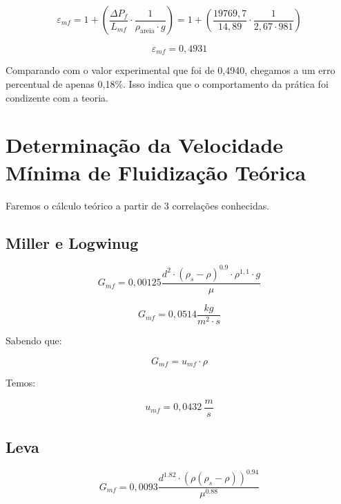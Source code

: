 \begin{equation}\label{key}
\varepsilon_{m f}=1+\left(\frac{\Delta P_{f}}{L_{m f}} \cdot \frac{1}{\rho_{\text {areia}} \cdot g}\right)=1+\left(\frac{19769,7}{14,89} \cdot \frac{1}{2,67 \cdot 981}\right)
\end{equation}

\begin{equation}\label{key}
\varepsilon_{m f}=0,4931
\end{equation}

Comparando com o valor experimental que foi de 0,4940, chegamos a um erro percentual de apenas 0,18\%. Isso indica que o comportamento da prática foi condizente com a teoria.

\section{Determinação da Velocidade Mínima de Fluidização Teórica}

Faremos o cálculo teórico a partir de 3 correlações conhecidas.

\subsection{Miller e Logwinug}


\begin{equation}\label{key}
G_{m f}=0,00125 \dfrac{d^{2} \cdot\left(\rho_{s}-\rho\right)^{0.9} \cdot \rho^{1,1} \cdot g}{\mu}
\end{equation}

\begin{equation}\label{key}
G_{m f}=0,0514 \frac{k g}{m^{2} \cdot s}
\end{equation}

Sabendo que:

\begin{equation}\label{key}
G_{m f}=u_{m f} \cdot \rho
\end{equation}

Temos:

\begin{equation}\label{key}
u_{m f}=0,0432 \ \frac{m}{s}
\end{equation}



\subsection{Leva}

\begin{equation}\label{key}
G_{m f}=0,0093 \frac{d^{1.82} \cdot\left(\rho\left(\rho_{s}-\rho\right)\right)^{0.94}}{\mu^{0.88}}
\end{equation}

